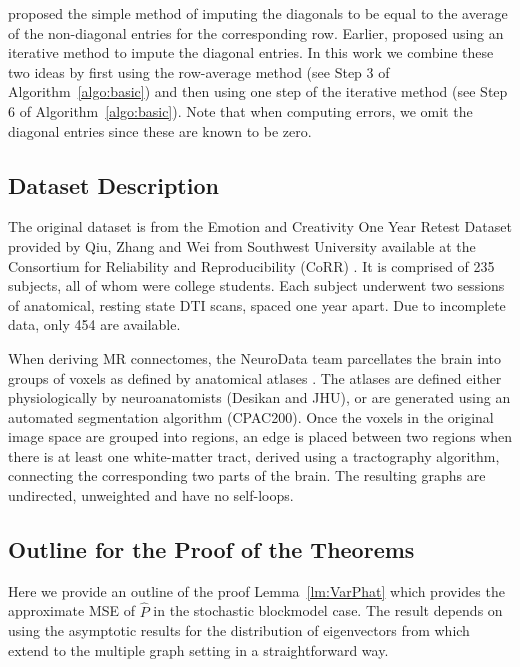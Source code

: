 \documentclass[10pt,letterpaper]{article}
\begin{document}
\citet{marchette2011vertex}  proposed the simple method of imputing the diagonals to be equal to the average of the non-diagonal entries for the corresponding row.
Earlier, \citet{scheinerman2010modeling} proposed using an iterative method to impute the diagonal entries.
In this work we combine these two ideas by first using the row-average method  (see Step 3 of Algorithm~\ref{algo:basic}) and then using one step of the iterative method (see Step 6 of Algorithm~\ref{algo:basic}).
Note that when computing errors, we omit the diagonal entries since these are known to be zero.



\subsection{Dataset Description}
\label{section:data}
The original dataset is from the Emotion and Creativity One Year Retest Dataset provided by Qiu, Zhang and Wei from Southwest University available at the Consortium for Reliability and Reproducibility (CoRR) \cite{zuo2014open, gorgolewski2015high}. It is comprised of 235 subjects, all of whom were college students. Each subject underwent two sessions of anatomical, resting state DTI scans, spaced one year apart. Due to incomplete data, only 454 are available.

When deriving MR connectomes, the NeuroData team parcellates the brain into groups of voxels as defined by anatomical atlases \cite{neurodata, kiar2016graph}. The atlases are defined either physiologically by neuroanatomists (Desikan and JHU), or are generated using an automated segmentation algorithm (CPAC200).
Once the voxels in the original image space are grouped into regions, an edge is placed between two regions when there is at least one white-matter tract, derived using a tractography algorithm, connecting the corresponding two parts of the brain.
The resulting graphs are undirected, unweighted and have no self-loops.


\subsection{Outline for the Proof of the Theorems}
\label{section:outline_proof}
Here we provide an outline of the proof Lemma~\ref{lm:VarPhat} which provides the approximate MSE of $\hat{P}$ in the stochastic blockmodel case.
The result depends on using the asymptotic results for the distribution of eigenvectors from \citet{athreya2013limit} which extend to the multiple graph setting in a straightforward way.
\end{document}

